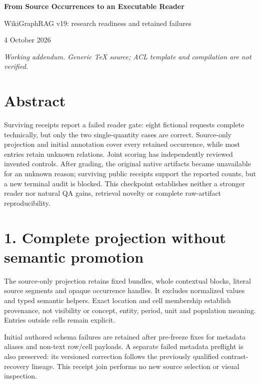 \documentclass[10pt,a4paper]{article}
\begin{document}
\begin{center}{\Large\bfseries From Source Occurrences to an Executable Reader}\par
WikiGraphRAG v19: research readiness and retained failures\par
4 October 2026\end{center}
\textit{Working addendum. Generic TeX source; ACL template and compilation are not verified.}
\section*{Abstract}
Surviving receipts report a failed reader gate: eight fictional requests complete technically, but only the two single-quantity cases are correct. Source-only projection and initial annotation cover every retained occurrence, while most entries retain unknown relations. Joint scoring has independently reviewed invented controls. After grading, the original native artifacts became unavailable for an unknown reason; surviving public receipts support the reported counts, but a new terminal audit is blocked. This checkpoint establishes neither a stronger reader nor natural QA gains, retrieval novelty or complete raw-artifact reproducibility.
\section*{1. Complete projection without semantic promotion}
The source-only projection retains fixed bundles, whole contextual blocks, literal source segments and opaque occurrence handles. It excludes normalized values and typed semantic helpers. Exact location and cell membership establish provenance, not visibility or concept, entity, period, unit and population meaning. Entries outside cells remain explicit.

Initial authored schema failures are retained after pre-freeze fixes for metadata aliases and non-text row/cell payloads. A separate failed metadata preflight is also preserved: its versioned correction follows the previously qualified contrast-recovery lineage. This receipt join performs no new source selection or visual inspection.
\end{document}

